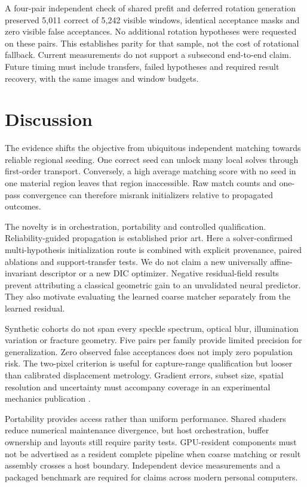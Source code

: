 \documentclass[11pt,a4paper]{article}
\begin{document}
A four-pair independent check of shared prefit and deferred rotation generation preserved 5,011 correct of 5,242 visible windows, identical acceptance masks and zero visible false acceptances. No additional rotation hypotheses were requested on these pairs. This establishes parity for that sample, not the cost of rotational fallback. Current measurements do not support a subsecond end-to-end claim. Future timing must include transfers, failed hypotheses and required result recovery, with the same images and window budgets.

\section{Discussion}
The evidence shifts the objective from ubiquitous independent matching towards reliable regional seeding. One correct seed can unlock many local solves through first-order transport. Conversely, a high average matching score with no seed in one material region leaves that region inaccessible. Raw match counts and one-pass convergence can therefore misrank initializers relative to propagated outcomes.

The novelty is in orchestration, portability and controlled qualification. Reliability-guided propagation is established prior art. Here a solver-confirmed multi-hypothesis initialization route is combined with explicit provenance, paired ablations and support-transfer tests. We do not claim a new universally affine-invariant descriptor or a new DIC optimizer. Negative residual-field results prevent attributing a classical geometric gain to an unvalidated neural predictor. They also motivate evaluating the learned coarse matcher separately from the learned residual.

Synthetic cohorts do not span every speckle spectrum, optical blur, illumination variation or fracture geometry. Five pairs per family provide limited precision for generalization. Zero observed false acceptances does not imply zero population risk. The two-pixel criterion is useful for capture-range qualification but looser than calibrated displacement metrology. Gradient errors, subset size, spatial resolution and uncertainty must accompany coverage in an experimental mechanics publication \citep{guide}.

Portability provides access rather than uniform performance. Shared shaders reduce numerical maintenance divergence, but host orchestration, buffer ownership and layouts still require parity tests. GPU-resident components must not be advertised as a resident complete pipeline when coarse matching or result assembly crosses a host boundary. Independent device measurements and a packaged benchmark are required for claims across modern personal computers.
\end{document}

